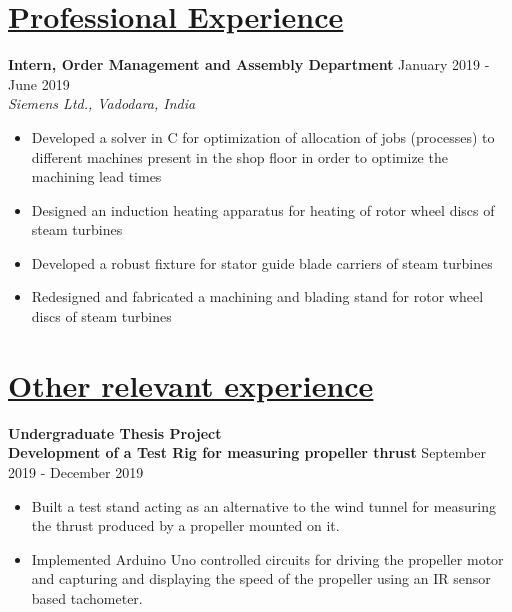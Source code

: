 \documentclass{article}
\def\siemensdate{\large{January 2019 - June 2019}}
\def\majordaterig{\large{September 2019 - December 2019}}
\begin{document}
\section{\underline{Professional Experience}}
\large{\textbf{Intern, Order Management and Assembly Department}}
\hspace{1.2 in}
\siemensdate\\
\large{\textit{Siemens Ltd., Vadodara, India}}
\begin{itemize}
\item\large{Developed a solver in C for optimization of allocation of jobs (processes) to different machines present in the shop floor in order to optimize the machining lead times}
\item\large{Designed an induction heating apparatus for heating of rotor wheel discs of steam turbines}
\item\large{Developed a robust fixture for stator guide blade carriers of steam turbines}
\item\large{Redesigned and fabricated a machining and blading stand for rotor wheel discs of steam turbines }
\end{itemize}

\section{\underline{Other relevant experience}}
\large{\textbf{Undergraduate Thesis Project}}\\
\large{\textbf{Development of a Test Rig for measuring propeller thrust}}
\hspace{0.7 in}
\majordaterig
\begin{itemize}
\item \large{Built a test stand acting as an alternative to the wind tunnel for measuring the thrust produced by a propeller mounted on it.}
\item\large{Implemented Arduino Uno controlled circuits for driving the propeller motor and capturing and displaying the speed of the propeller using an IR sensor based tachometer.}
\end{itemize}
\vspace{2 in}

\end{document}
